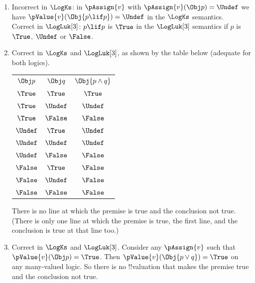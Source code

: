 \documentclass[../../../../include/open-logic-section]{subfiles}
\begin{document}
\begin{prob}[Validity]
\begin{ans}
\begin{enumerate}
	logics).
	\begin{center}
	\begin{tabular}{|c|cc|}
	\hline
	$\Obj p$ 	&	$\Obj{\lnot p}$		&	$\Obj{\lnot \lnot p}$\\
	\hline
	$\True$		&	$\False$			&	$\True$\\
	$\Undef$	&	$\Undef$			&	$\True$\\
	$\False$	&	$\True$				&	$\True$\\
	\hline
	\end{tabular}
	\end{center}
\item Incorrect in $\LogKs$: in $\pAssign{v}$ with $\pAssign{v}(\Obj
	p)=\Undef$ we have $\pValue{v}(\Obj {p \lif p})=\Undef$ in the $\LogKs$
	semantics.\\
	Correct in $\LogLuk[3]$: $p \lif p$ is $\True$ in the $\LogLuk[3]$
	semantics if $p$ is $\True$, $\Undef$ or $\False$.
\item Correct in $\LogKs$ and $\LogLuk[3]$, as shown by the 
	table below (adequate for both logics).
	\begin{center}
	\begin{tabular}{|cc|c|}
	\hline
	$\Obj p$	&	$\Obj q$	&	$\Obj{p \land q}$	\\
	$\True$		&	$\True$		& 		$\True$ 		\\
	$\True$		&	$\Undef$ 	& 		$\Undef$		\\
	$\True$		&	$\False$ 	& 		$\False$ \\
	$\Undef$	&	$\True$		& 		$\Undef$ 		\\
	$\Undef$	&	$\Undef$ 	& 		$\Undef$		\\
	$\Undef$	&	$\False$ 	& 		$\False$ \\
	$\False$	&	$\True$		& 		$\False$ 		\\
	$\False$	&	$\Undef$ 	& 		$\False$		\\
	$\False$	&	$\False$ 	& 		$\False$ \\
	\hline
	\end{tabular}
	\end{center}
	There is no line at which the premise is true and the conclusion
	not true. (There is only one line at which the premise is true, 
	the first line, and the conclusion is true at that line too.)
\item Correct in $\LogKs$ and $\LogLuk[3]$. Consider any $\pAssign{v}$ 
	such that $\pValue{v}(\Obj p)=\True$. Then $\pValue{v}(\Obj{p \lor q})=\True$ 
	on any many-valued logic. So there is no !!{valuation} that makes
	the premise true and the conclusion not true. 

\end{enumerate}
\end{ans}
\end{prob}
\end{document}
